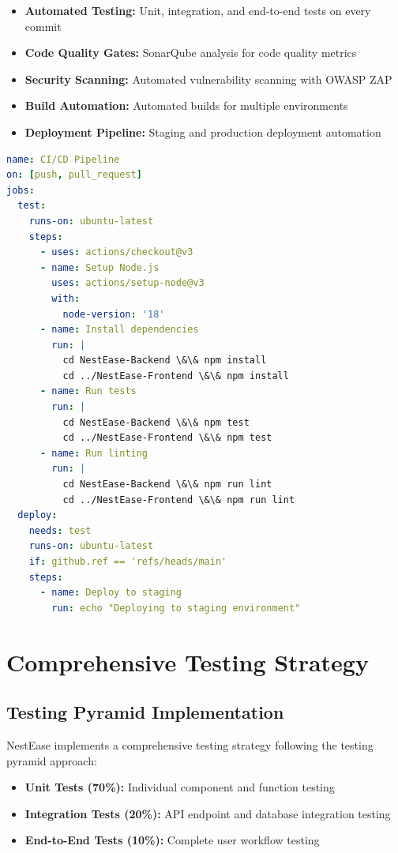 \documentclass[conference]{IEEEtran}
\begin{document}
\begin{itemize}
    \item \textbf{Automated Testing:} Unit, integration, and end-to-end tests on every commit
    \item \textbf{Code Quality Gates:} SonarQube analysis for code quality metrics
    \item \textbf{Security Scanning:} Automated vulnerability scanning with OWASP ZAP
    \item \textbf{Build Automation:} Automated builds for multiple environments
    \item \textbf{Deployment Pipeline:} Staging and production deployment automation
\end{itemize}

\begin{lstlisting}[language=yaml, caption=GitHub Actions Workflow]
name: CI/CD Pipeline
on: [push, pull_request]
jobs:
  test:
    runs-on: ubuntu-latest
    steps:
      - uses: actions/checkout@v3
      - name: Setup Node.js
        uses: actions/setup-node@v3
        with:
          node-version: '18'
      - name: Install dependencies
        run: |
          cd NestEase-Backend \&\& npm install
          cd ../NestEase-Frontend \&\& npm install
      - name: Run tests
        run: |
          cd NestEase-Backend \&\& npm test
          cd ../NestEase-Frontend \&\& npm test
      - name: Run linting
        run: |
          cd NestEase-Backend \&\& npm run lint
          cd ../NestEase-Frontend \&\& npm run lint
  deploy:
    needs: test
    runs-on: ubuntu-latest
    if: github.ref == 'refs/heads/main'
    steps:
      - name: Deploy to staging
        run: echo "Deploying to staging environment"
\end{lstlisting}

\section{Comprehensive Testing Strategy}
\subsection{Testing Pyramid Implementation}
NestEase implements a comprehensive testing strategy following the testing pyramid approach:

\begin{itemize}
    \item \textbf{Unit Tests (70\%):} Individual component and function testing
    \item \textbf{Integration Tests (20\%):} API endpoint and database integration testing
    \item \textbf{End-to-End Tests (10\%):} Complete user workflow testing
\end{itemize}
\end{document}
